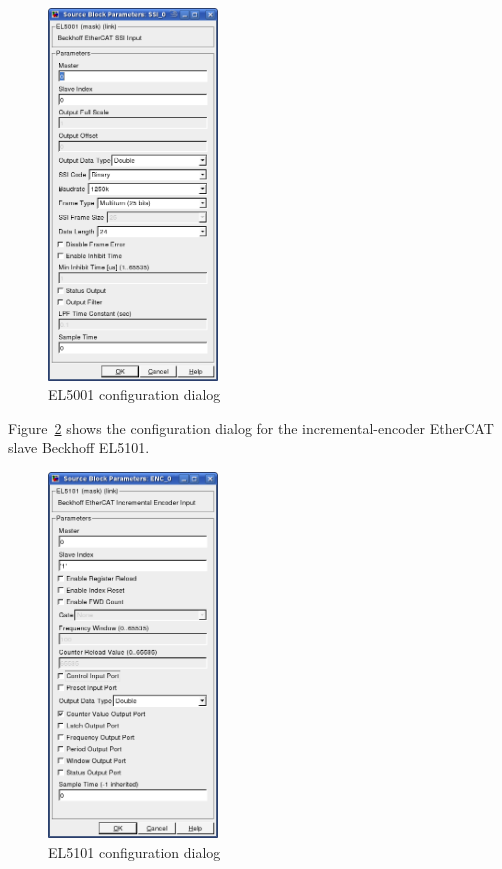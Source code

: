 \begin{figure}[H]
  \begin{center}
    \includegraphics[width=0.4\textwidth]{images/el5001.png}
    \caption{EL5001 configuration dialog}
    \label{fig:el5001}
  \end{center}
\end{figure}

Figure~\ref{fig:el5101} shows the configuration dialog for the
incremental-encoder EtherCAT slave Beckhoff EL5101.

\begin{figure}[H]
  \begin{center}
    \includegraphics[width=0.4\textwidth]{images/el5101.png}
    \caption{EL5101 configuration dialog}
    \label{fig:el5101}
  \end{center}
\end{figure}

